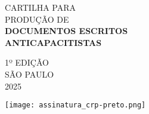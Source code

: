 
\vspace*{\fill}
\begin{minipage}{0.3\textwidth}
    \hfill
\end{minipage}%
\begin{minipage}{0.7\textwidth}
\begin{flushleft}
\fininha\LARGE
\color{black!70}CARTILHA PARA\\PRODUÇÃO DE\\
\media\color{black}\textbf{DOCUMENTOS ESCRITOS\\ANTICAPACITISTAS}
\vspace*{2\baselineskip}

\color{black!50}
\Light
\normalsize
1º EDIÇÃO\\
SÃO PAULO\\
2025
\end{flushleft}
\end{minipage}
\vspace*{\baselineskip}
\begin{center}
    \texttt{[image: assinatura\_crp-preto.png]}
\end{center}